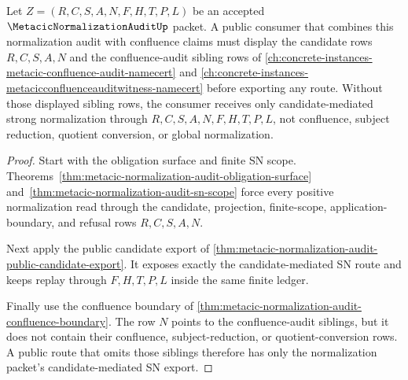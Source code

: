 \begin{theorem}
\label{thm:metacic-normalization-audit-public-candidate-confluence-refusal}
Let $Z=(R,C,S,A,N,F,H,T,P,L)$ be an accepted $\MetacicNormalizationAuditUp$ packet. A public consumer that combines this normalization audit with confluence claims must display the candidate rows $R,C,S,A,N$ and the confluence-audit sibling rows of \autoref{ch:concrete-instances-metacic-confluence-audit-namecert} and \autoref{ch:concrete-instances-metacicconfluenceauditwitness-namecert} before exporting any route. Without those displayed sibling rows, the consumer receives only candidate-mediated strong normalization through $R,C,S,A,N,F,H,T,P,L$, not confluence, subject reduction, quotient conversion, or global normalization.
\end{theorem}
\begin{proof}
Start with the obligation surface and finite SN scope. Theorems~\ref{thm:metacic-normalization-audit-obligation-surface} and~\ref{thm:metacic-normalization-audit-sn-scope} force every positive normalization read through the candidate, projection, finite-scope, application-boundary, and refusal rows $R,C,S,A,N$.

Next apply the public candidate export of \autoref{thm:metacic-normalization-audit-public-candidate-export}. It exposes exactly the candidate-mediated SN route and keeps replay through $F,H,T,P,L$ inside the same finite ledger.

Finally use the confluence boundary of \autoref{thm:metacic-normalization-audit-confluence-boundary}. The row $N$ points to the confluence-audit siblings, but it does not contain their confluence, subject-reduction, or quotient-conversion rows. A public route that omits those siblings therefore has only the normalization packet's candidate-mediated SN export.
\end{proof}

